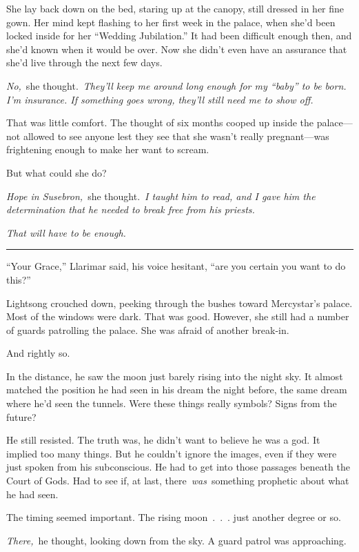 She lay back down on the bed, staring up at the canopy, still dressed in her fine gown. Her mind kept flashing to her first week in the palace, when she’d been locked inside for her “Wedding Jubilation.” It had been difficult enough then, and she’d known when it would be over. Now she didn’t even have an assurance that she’d live through the next few days.

\textit{No,}~she thought.~\textit{They’ll keep me around long enough for my “baby” to be born. I’m insurance. If something goes wrong, they’ll still need me to show off.}

That was little comfort. The thought of six months cooped up inside the palace—not allowed to see anyone lest they see that she wasn’t really pregnant—was frightening enough to make her want to scream.

But what could she do?

\textit{Hope in Susebron,}~she thought.~\textit{I taught him to read, and I gave him the determination that he needed to break free from his priests.}

\textit{That will have to be enough.}

\bigskip \hrule \bigskip

“Your Grace,” Llarimar said, his voice hesitant, “are you certain you want to do this?”

Lightsong crouched down, peeking through the bushes toward Mercystar’s palace. Most of the windows were dark. That was good. However, she still had a number of guards patrolling the palace. She was afraid of another break-in.

And rightly so.

In the distance, he saw the moon just barely rising into the night sky. It almost matched the position he had seen in his dream the night before, the same dream where he’d seen the tunnels. Were these things really symbols? Signs from the future?

He still resisted. The truth was, he didn’t want to believe he was a god. It implied too many things. But he couldn’t ignore the images, even if they were just spoken from his subconscious. He had to get into those passages beneath the Court of Gods. Had to see if, at last, there~\textit{was}~something prophetic about what he had seen.

The timing seemed important. The rising moon~.~.~. just another degree or so.

\textit{There,}~he thought, looking down from the sky. A guard patrol was approaching.

